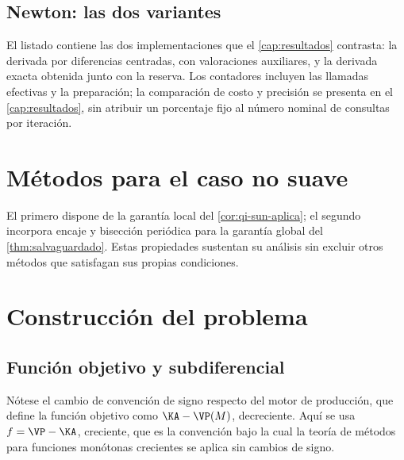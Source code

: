 

\subsection{Newton: las dos variantes}

El listado contiene las dos implementaciones que el \cref{cap:resultados}
contrasta: la derivada por diferencias centradas, con valoraciones auxiliares, y
la derivada exacta obtenida junto con la reserva. Los contadores incluyen las
llamadas efectivas y la preparación; la comparación de costo y precisión se
presenta en el \cref{cap:resultados}, sin atribuir un porcentaje fijo al número
nominal de consultas por iteración.



\section{Métodos para el caso no suave}

El primero dispone de la garantía local del \cref{cor:qi-sun-aplica}; el segundo
incorpora encaje y bisección periódica para la garantía global del
\cref{thm:salvaguardado}. Estas propiedades sustentan su análisis sin excluir
otros métodos que satisfagan sus propias condiciones.



\section{Construcción del problema}

\subsection{Función objetivo y subdiferencial}

Nótese el cambio de convención de signo respecto del motor de producción, que
define la función objetivo como $\KA-\VP(M)$, decreciente. Aquí se usa
$f=\VP-\KA$, creciente, que es la convención bajo la cual la teoría de métodos
para funciones monótonas crecientes se aplica sin cambios de signo.


